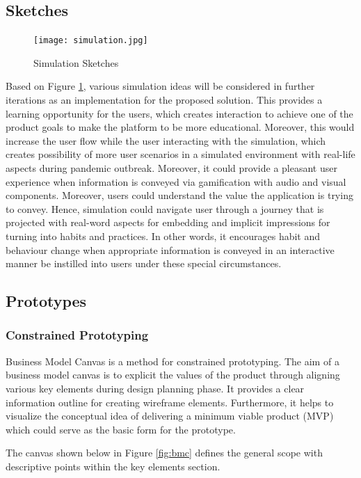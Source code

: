   \subsection{Sketches}
  \begin{figure}[H]
    \centering
    \texttt{[image: simulation.jpg]}
    \caption{Simulation Sketches}
    \label{fig:simulation}
  \end{figure}
  \par Based on Figure \ref{fig:simulation}, various simulation ideas will be considered in further iterations as an implementation for the proposed solution. This provides a learning opportunity for the users, which creates interaction to achieve one of the product goals to make the platform to be more educational. Moreover, this would increase the user flow while the user interacting with the simulation, which creates possibility of more user scenarios in a simulated environment with real-life aspects during pandemic outbreak. Moreover, it could provide a pleasant user experience when information is conveyed via gamification with audio and visual components. Moreover, users could understand the value the application is trying to convey. Hence, simulation could navigate user through a journey that is projected with real-word aspects for embedding and implicit impressions for turning into habits and practices. In other words, it encourages habit and behaviour change when appropriate information is conveyed in an interactive manner be instilled into users under these special circumstances.

  \subsection{Prototypes}
    \subsubsection{Constrained Prototyping}
      \par Business Model Canvas is a method for constrained prototyping. The aim of a business model canvas is to explicit the values of the product through aligning various key elements during design planning phase. It provides a clear information outline for creating wireframe elements. Furthermore, it helps to visualize the conceptual idea of delivering a minimum viable product (MVP) which could serve as the basic form for the prototype.

      \par The canvas shown below in Figure \ref{fig:bmc} defines the general scope with descriptive points within the key elements section.

